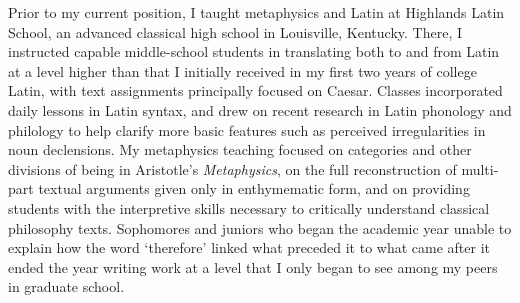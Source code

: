 Prior to my current position, 
I taught metaphysics and Latin at Highlands Latin School, 
an advanced classical high school in Louisville, Kentucky. 
There, I instructed capable middle-school students in translating both to and from Latin at a level higher than that I initially received in my first two years of college Latin, 
with text assignments principally focused on Caesar. 
Classes incorporated daily lessons in Latin syntax, 
and drew on recent research in Latin phonology and philology to help clarify more basic features such as perceived irregularities in noun declensions. 
My metaphysics teaching focused on categories and other divisions of being in Aristotle's \emph{Metaphysics}, 
on the full reconstruction of multi-part textual arguments given only in enthymematic form, 
and on providing students with the interpretive skills necessary to critically understand classical philosophy texts. 
Sophomores and juniors who began the academic year unable to explain how the word `therefore' linked what preceded it to what came after it ended the year writing work at a level that I only began to see among my peers in graduate school. 